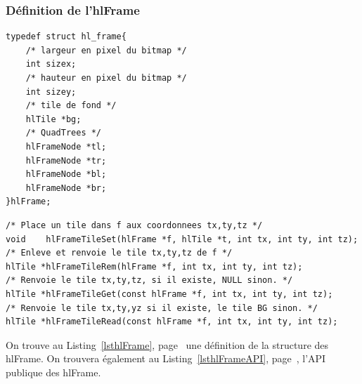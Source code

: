 			\subsubsection{Définition de l'hlFrame}
		\begin{lstlisting}[float,caption={Définition des hlFrames },frame=tb,label=lsthlFrame]
typedef struct hl_frame{
	/* largeur en pixel du bitmap */
	int sizex;
	/* hauteur en pixel du bitmap */
	int sizey;
	/* tile de fond */
	hlTile *bg;
	/* QuadTrees */
	hlFrameNode *tl;
	hlFrameNode *tr;
	hlFrameNode *bl;
	hlFrameNode *br;
}hlFrame;
		\end{lstlisting}
		\begin{lstlisting}[float,caption={API Publique des hlFrame},frame=tb,label=lsthlFrameAPI]
/* Place un tile dans f aux coordonnees tx,ty,tz */
void	hlFrameTileSet(hlFrame *f, hlTile *t, int tx, int ty, int tz); 
/* Enleve et renvoie le tile tx,ty,tz de f */
hlTile *hlFrameTileRem(hlFrame *f, int tx, int ty, int tz); 
/* Renvoie le tile tx,ty,tz, si il existe, NULL sinon. */
hlTile *hlFrameTileGet(const hlFrame *f, int tx, int ty, int tz);
/* Renvoie le tile tx,ty,yz si il existe, le tile BG sinon. */
hlTile *hlFrameTileRead(const hlFrame *f, int tx, int ty, int tz);
		\end{lstlisting}
				On trouve au Listing~\ref{lsthlFrame}, page~\pageref{lsthlFrame} une définition de la structure des hlFrame.
				On trouvera également au Listing~\ref{lsthlFrameAPI}, page~\pageref{lsthlFrameAPI}, 
				l'API publique des hlFrame.


